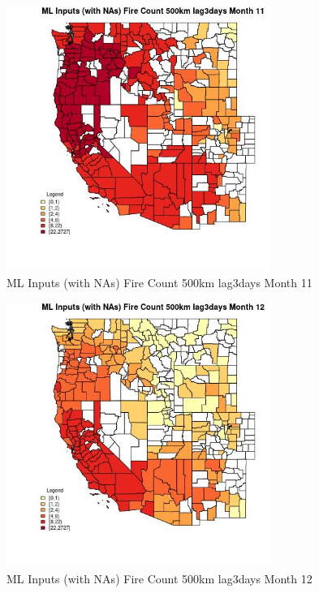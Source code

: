 \clearpage 

\begin{figure} 
\centering  
\includegraphics[width=0.77\textwidth]{Code_Outputs/Report_ML_input_PM25_Step4_part_f_de_duplicated_aves_prioritize_24hr_obswNAs_CountyFire_Count_500km_lag3daysmedianMonth11.jpg} 
\caption{\label{fig:Report_ML_input_PM25_Step4_part_f_de_duplicated_aves_prioritize_24hr_obswNAsCountyFire_Count_500km_lag3daysmedianMonth11}ML Inputs (with NAs) Fire Count 500km lag3days Month 11} 
\end{figure} 
 

\begin{figure} 
\centering  
\includegraphics[width=0.77\textwidth]{Code_Outputs/Report_ML_input_PM25_Step4_part_f_de_duplicated_aves_prioritize_24hr_obswNAs_CountyFire_Count_500km_lag3daysmedianMonth12.jpg} 
\caption{\label{fig:Report_ML_input_PM25_Step4_part_f_de_duplicated_aves_prioritize_24hr_obswNAsCountyFire_Count_500km_lag3daysmedianMonth12}ML Inputs (with NAs) Fire Count 500km lag3days Month 12} 
\end{figure} 
 

